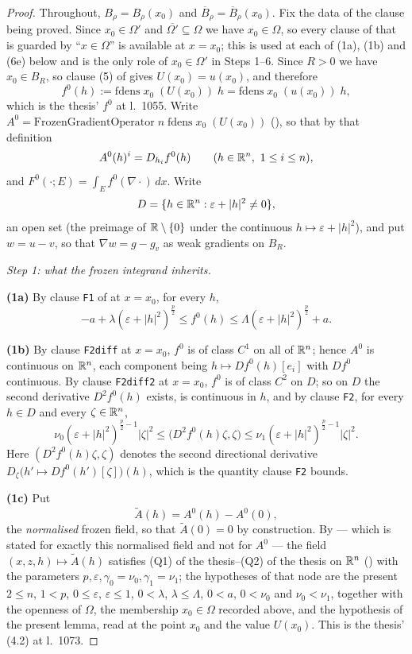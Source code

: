 \begin{proof}
Throughout, $B_\rho=B_\rho(x_0)$ and $\overline B_\rho=\overline B_\rho(x_0)$.
Fix the data of the clause being proved.  Since $x_0\in\Omega'$ and
$\overline{\Omega'}\subseteq\Omega$ we have $x_0\in\Omega$, so every clause of
 that is guarded by ``$x\in\Omega$'' is
available at $x=x_0$; this is used at each of (1a), (1b) and (6e) below and is
the only role of $x_0\in\Omega'$ in Steps 1--6.  Since $R>0$ we have
$x_0\in B_R$, so clause (5) of  gives
$U(x_0)=u(x_0)$, and therefore
\[
f^0(h):=\mathrm{fdens}\;x_0\;(U(x_0))\;h=\mathrm{fdens}\;x_0\;(u(x_0))\;h ,
\]
which is the thesis' $f^0$ at l.~1055.  Write
$A^0=\mathrm{FrozenGradientOperator}\;n\;\mathrm{fdens}\;x_0\;(U(x_0))$
(), so that by that definition
\[
A^0(h)^i=D_{h_i}f^0(h)\qquad(h\in\mathbb{R}^n,\ 1\le i\le n),
\]
and $F^0(\cdot;E)=\int_Ef^0(\nabla\cdot)\,dx$.  Write
\[
D=\{h\in\mathbb{R}^n:\varepsilon+|h|^2\ne0\},
\]
an open set (the preimage of $\mathbb{R}\setminus\{0\}$ under the continuous
$h\mapsto\varepsilon+|h|^2$), and put $w=u-v$, so that $\nabla w=g-g_v$ as weak
gradients on $B_R$.

\medskip
\noindent\emph{Step 1: what the frozen integrand inherits.}

\textbf{(1a)} By clause \texttt{F1} of  at
$x=x_0$, for every $h$,
\[
-a+\lambda(\varepsilon+|h|^2)^{\frac p2}\le f^0(h)\le\Lambda(\varepsilon+|h|^2)^{\frac p2}+a .
\tag{1.1}
\]

\textbf{(1b)} By clause \texttt{F2diff} at $x=x_0$, $f^0$ is of class $C^1$ on
all of $\mathbb{R}^n$; hence $A^0$ is continuous on $\mathbb{R}^n$, each component being
$h\mapsto Df^0(h)[e_i]$ with $Df^0$ continuous.  By clause \texttt{F2diff2} at
$x=x_0$, $f^0$ is of class $C^2$ on $D$; so on $D$ the second derivative
$D^2f^0(h)$ exists, is continuous in $h$, and by clause \texttt{F2}, for every
$h\in D$ and every $\zeta\in\mathbb{R}^n$,
\[
\nu_0(\varepsilon+|h|^2)^{\frac p2-1}|\zeta|^2
\le\bigl(D^2f^0(h)\zeta,\zeta\bigr)
\le\nu_1(\varepsilon+|h|^2)^{\frac p2-1}|\zeta|^2 .
\tag{1.2}
\]
Here $(D^2f^0(h)\zeta,\zeta)$ denotes the second directional derivative
$D_\zeta\bigl(h'\mapsto Df^0(h')[\zeta]\bigr)(h)$, which is the quantity
clause \texttt{F2} bounds.

\textbf{(1c)} Put
\[
\widetilde A(h)=A^0(h)-A^0(0),
\]
the \emph{normalised} frozen field, so that $\widetilde A(0)=0$ by
construction.  By  --- which is stated for
exactly this normalised field and not for $A^0$ --- the field
$(x,z,h)\mapsto\widetilde A(h)$ satisfies (Q1) of the thesis--(Q2) of the thesis on
$\mathbb{R}^n$ () with the parameters
$p,\varepsilon,\gamma_0=\nu_0,\gamma_1=\nu_1$; the hypotheses of that node are
the present $2\le n$, $1<p$, $0\le\varepsilon$, $\varepsilon\le1$, $0<\lambda$,
$\lambda\le\Lambda$, $0<a$, $0<\nu_0$ and $\nu_0<\nu_1$, together with the
openness of $\Omega$, the membership $x_0\in\Omega$ recorded above, and the
 hypothesis of the present lemma, read at the
point $x_0$ and the value $U(x_0)$.  This is the thesis' (4.2) at l.~1073.


\end{proof}
